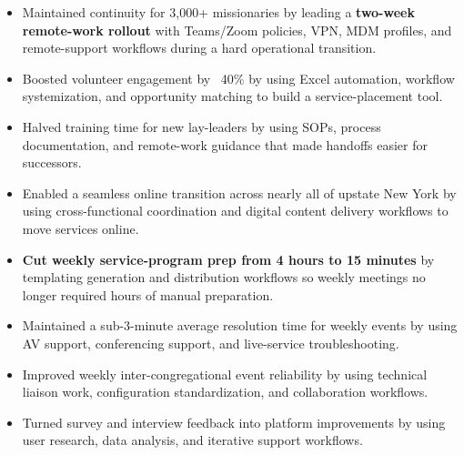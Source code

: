 \par\smallskip
\noindent
\begin{minipage}[t]{20cm}%
  \begin{minipage}[t]{9.75cm}%
    \begin{itemize}
      \item Maintained continuity for 3,000+ missionaries by leading a \textbf{two-week remote-work rollout} with Teams/Zoom policies, VPN, MDM profiles, and remote-support workflows during a hard operational transition.
      \item Boosted volunteer engagement by ~40\% by using Excel automation, workflow systemization, and opportunity matching to build a service-placement tool.
      \item Halved training time for new lay-leaders by using SOPs, process documentation, and remote-work guidance that made handoffs easier for successors.
      \item Enabled a seamless online transition across nearly all of upstate New York by using cross-functional coordination and digital content delivery workflows to move services online.

    \end{itemize}
  \end{minipage}%
  \hfill%
  \begin{minipage}[t]{9.75cm}%
    \begin{itemize}
      \item \textbf{Cut weekly service-program prep from 4 hours to 15 minutes} by templating generation and distribution workflows so weekly meetings no longer required hours of manual preparation.
      \item Maintained a sub-3-minute average resolution time for weekly events by using AV support, conferencing support, and live-service troubleshooting.
      \item Improved weekly inter-congregational event reliability by using technical liaison work, configuration standardization, and collaboration workflows.
      \item Turned survey and interview feedback into platform improvements by using user research, data analysis, and iterative support workflows.
    \end{itemize}
  \end{minipage}%
\end{minipage}

